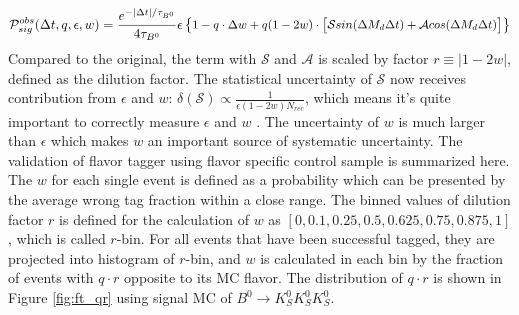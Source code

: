 \begin{equation}\label{eq:tdcpv_all_ft}
\small
\mathcal{P}_{sig}^{obs}(\Delta t, q, \epsilon, w) = 
\frac{e^{-|\Delta t|/\tau_{B^0}}}{4\tau_{B^0}}
\epsilon
\begin{Bmatrix}
1 - q\cdot \Delta w+ q(1-2w)\cdot 
\begin{bmatrix}
\mathcal{S}sin(\Delta M_d \Delta t) + 
\mathcal{A}cos(\Delta M_d \Delta t)
\end{bmatrix}
\end{Bmatrix}
\end{equation} 
Compared to the original, the term with $\mathcal{S}$ and $\mathcal{A}$ is scaled by factor $r\equiv |1-2w|$, defined as the dilution factor. The statistical uncertainty of $\mathcal{S}$ now receives contribution from $\epsilon$ and $w$: $\delta(\mathcal{S}) \propto \frac{1}{\epsilon (1-2w)N_{rec}}$, which means it's quite important to correctly measure $\epsilon$ and $w$ . The uncertainty of $w$ is much larger than $\epsilon$ which makes $w$ an important source of systematic uncertainty. The validation of flavor tagger using flavor specific control sample is summarized here\cite{flavortagger}. The $w$ for each single event is defined as a probability which can be presented by the average wrong tag fraction within a close range. The binned values of dilution factor $r$ is defined for the calculation of $w$ as $[0,0.1,0.25,0.5,0.625,0.75,0.875,1]$, which is called $r$-bin. For all events that have been successful tagged, they are projected into histogram of $r$-bin, and $w$ is calculated in each bin by the fraction of events with $q\cdot r$ opposite to its MC flavor. The distribution of $q\cdot r$ is shown in Figure \ref{fig:ft_qr} using signal MC of $B^0 \to K_S^0  K_S^0  K_S^0$. 

